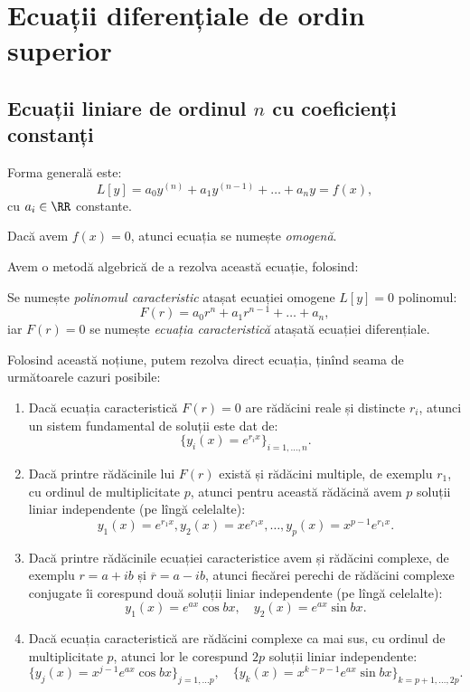 
\chapter{Ecuații diferențiale de ordin superior}

\section{Ecuații liniare de ordinul $n$ cu coeficienți constanți}

Forma generală este:
\[
  L[y] = a_0 y^{(n)} + a_1 y^{(n-1)} + \dots + a_n y = f(x),
\]
cu $a_i \in \RR$ constante.

Dacă avem $f(x) = 0$, atunci ecuația se numește \emph{omogenă}.

Avem o metodă algebrică de a rezolva această ecuație, folosind:

\begin{definition}\label{def:pol-car-ec}
  Se numește \emph{polinomul caracteristic} atașat ecuației omogene $L[y] = 0$
  polinomul:
  \[
    F(r) = a_0 r^n + a_1 r^{n-1} + \dots + a_n,
  \]
  iar $F(r) = 0$ se numește \emph{ecuația caracteristică} atașată ecuației diferențiale.
\end{definition}

Folosind această noțiune, putem rezolva direct ecuația, ținînd seama de următoarele
cazuri posibile:

\begin{theorem}\label{thm:ec-car-dif}
  \begin{enumerate}[(1)]
  \item Dacă ecuația caracteristică $F(r) = 0$ are rădăcini reale și distincte $r_i$,
    atunci un sistem fundamental de soluții este dat de:
    \[
      \big\{ y_i(x) = e^{r_i x} \big\}_{i=1,\dots,n}.
    \]
  \item Dacă printre rădăcinile lui $F(r)$ există și rădăcini multiple, de exemplu
    $r_1$, cu ordinul de multiplicitate $p$, atunci pentru această rădăcină avem
    $p$ soluții liniar independente (pe lîngă celelalte):
    \[
      y_1(x) = e^{r_1 x}, y_2(x) = xe^{r_1 x}, \dots, y_p(x) = x^{p-1} e^{r_1 x}.
    \]
  \item Dacă printre rădăcinile ecuației caracteristice avem și rădăcini complexe,
    de exemplu $r = a + ib$ și $\overline{r} = a - ib$, atunci fiecărei perechi
    de rădăcini complexe conjugate îi corespund două soluții liniar independente
    (pe lîngă celelalte):
    \[
      y_1(x) = e^{ax} \cos bx, \quad y_2(x) = e^{ax} \sin bx.
    \]
  \item Dacă ecuația caracteristică are rădăcini complexe ca mai sus, cu ordinul
    de multiplicitate $p$, atunci lor le corespund $2p$ soluții liniar independente:
    \[
      \big\{ y_j(x) = x^{j-1} e^{ax} \cos bx \big\}_{j=1, \dots p}, \quad
      \big\{ y_k(x) = x^{k-p-1} e^{ax} \sin bx\big\}_{k=p+1, \dots, 2p}.
    \]
  \end{enumerate}
\end{theorem}

